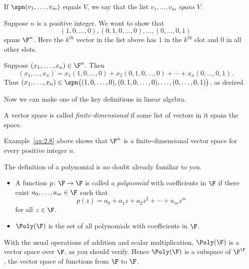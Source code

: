 \begin{definition}[Spans]\label{ax:2.7}
If $\spn(v_1,\dots,v_m)$ equals $V$, we say that the list $v_1,\dots,v_m$
\emph{spans} $V$.
\end{definition}

\begin{example}\label{ax:2.8}
Suppose $n$ is a positive integer. We want to show that
\[ (1,0,\dots,0),(0,1,0,\dots,0),\dots,(0,\dots,0,1) \]
spans $\F^n$. Here the $k^{\text{th}}$ vector in the list above has $1$ in the
$k^{\text{th}}$ slot and $0$ in all other slots.

Suppose $(x_1,\dots,x_n)\in\F^n$. Then
\[ (x_1,\dots,x_n) = x_1(1,0,\dots,0)+x_2(0,1,0,\dots,0)+\cdots
   +x_n(0,\dots,0,1). \]
Thus $(x_1,\dots,x_n)\in
\spn\bigl((1,0,\dots,0),(0,1,0,\dots,0),\dots,(0,\dots,0,1)\bigr)$, as
desired.
\end{example}

Now we can make one of the key definitions in linear algebra.

\begin{definition}\label{ax:2.9}
A vector space is called \emph{finite-dimensional} if some list of vectors in
it spans the space.
\end{definition}

%
Example~\ref{ax:2.8} above shows that $\F^n$ is a finite-dimensional vector
space for every positive integer $n$.

The definition of a polynomial is no doubt already familiar to you.

\begin{definition}\label{ax:2.10}\leavevmode
\begin{itemize}
\item A function $p\colon\F\to\F$ is called a \emph{polynomial} with
  coefficients in $\F$ if there exist $a_0,\dots,a_m\in\F$ such that
  \[ p(z) = a_0+a_1z+a_2z^2+\cdots+a_mz^m \]
  for all $z\in\F$.
\item $\Poly(\F)$ is the set of all polynomials with coefficients in $\F$.
\end{itemize}
\end{definition}

With the usual operations of addition and scalar multiplication, $\Poly(\F)$ is
a vector space over $\F$, as you should verify. Hence $\Poly(\F)$ is a subspace
of $\F^{\F}$, the vector space of functions from $\F$ to $\F$.

